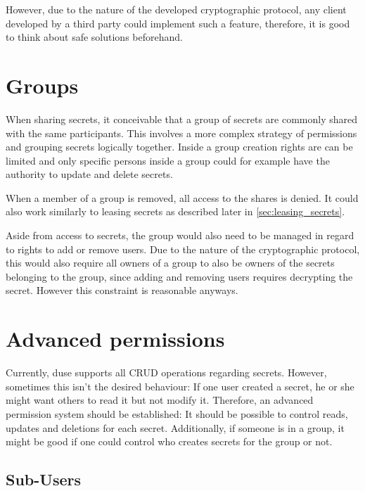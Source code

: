 However, due to the nature of the developed cryptographic protocol, any client
developed by a third party could implement such a feature, therefore, it is
good to think about safe solutions beforehand.

\section{Groups}

When sharing secrets, it conceivable that a group of secrets are commonly
shared with the same participants. This involves a more complex strategy of
permissions and grouping secrets logically together. Inside a group creation
rights are can be limited and only specific persons inside a group could for
example have the authority to update and delete secrets.

When a member of a group is removed, all access to the shares is denied. It
could also work similarly to leasing secrets as described later in
\ref{sec:leasing_secrets}.

Aside from access to secrets, the group would also need to be managed in regard
to rights to add or remove users. Due to the nature of the cryptographic
protocol, this would also require all owners of a group to also be owners of
the secrets belonging to the group, since adding and removing users requires
decrypting the secret. However this constraint is reasonable anyways.

\section{Advanced permissions}

Currently, duse supports all CRUD operations regarding secrets. However,
sometimes this isn't the desired behaviour: If one user created a secret,
he or she might want others to read it but not modify it. Therefore, an
advanced permission system should be established: It should be possible to
control reads, updates and deletions for each secret. Additionally, if
someone is in a group, it might be good if one could control who creates
secrets for the group or not.

\subsection{Sub-Users}

